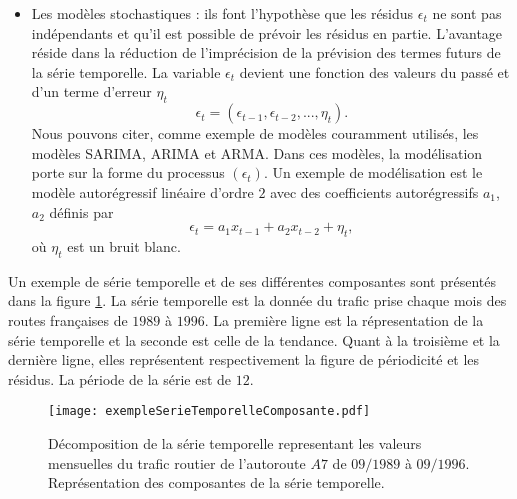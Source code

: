 \begin{itemize}
	\item Les mod\`eles stochastiques : ils font l'hypoth\`ese que les r\'esidus $\epsilon_t$ ne sont pas ind\'ependants et qu'il est possible de pr\'evoir les r\'esidus en partie. L'avantage r\'eside dans la r\'eduction de l'impr\'ecision de la pr\'evision des termes futurs de la s\'erie temporelle.  La variable $\epsilon_t$ devient une fonction des valeurs du pass\'e et d'un terme d'erreur $\eta_t$ $$\epsilon_t = (\epsilon_{t-1}, \epsilon_{t-2}, ... , \eta_{t}).$$
	Nous pouvons citer, comme exemple de mod\`eles couramment utilis\'es, les mod\`eles SARIMA, ARIMA et ARMA. Dans ces mod\`eles, la mod\'elisation porte sur la forme du processus $(\epsilon_t)$. Un exemple de mod\'elisation est le mod\`ele autor\'egressif lin\'eaire d'ordre $2$ avec des coefficients autor\'egressifs $a_1$, $a_2$ d\'efinis par 
	$$\epsilon_t = a_1 x_{t-1} + a_2 x_{t-2} + \eta_t,$$ o\`u $\eta_t$ est un bruit blanc.
\end{itemize}
Un exemple de s\'erie temporelle et de ses diff\'erentes composantes sont pr\'esent\'es dans la figure \ref{exempleSerieTemporelleComposante}. La s\'erie temporelle est la donn\'ee du trafic prise chaque mois des routes fran\c caises de $1989$ \`a $1996$.
La premi\`ere ligne est la r\'epresentation de la s\'erie temporelle et la seconde est celle de la tendance. Quant \`a la troisi\`eme  et la derni\`ere ligne, elles repr\'esentent respectivement la figure de p\'eriodicit\'e et les r\'esidus. La p\'eriode de la s\'erie est de $12$.
\begin{figure}[htb!] 
\centering
\texttt{[image: exempleSerieTemporelleComposante.pdf]}
\caption{ 
	D\'ecomposition de la s\'erie temporelle representant les valeurs mensuelles du trafic routier de l'autoroute $A7$ de $09/1989$ \`a $09/1996$. Repr\'esentation des composantes de la s\'erie temporelle.} 
\label{exempleSerieTemporelleComposante}
\end{figure}

